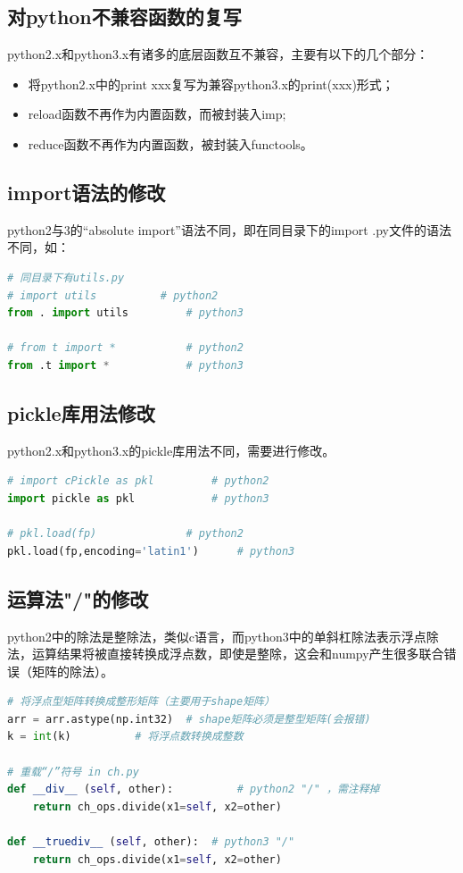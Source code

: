 \documentclass{article}
\begin{document}
\subsection{对python不兼容函数的复写}
python2.x和python3.x有诸多的底层函数互不兼容，主要有以下的几个部分：
\begin{itemize}
	\item 将python2.x中的print xxx复写为兼容python3.x的print(xxx)形式；
	\item reload函数不再作为内置函数，而被封装入imp;
	\item reduce函数不再作为内置函数，被封装入functools。
\end{itemize}

\subsection{import语法的修改}
python2与3的“absolute import”语法不同，即在同目录下的import .py文件的语法不同，如：
\begin{lstlisting}[language=python]
# 同目录下有utils.py
# import utils 			# python2
from . import utils 		# python3
    
# from t import * 			# python2
from .t import * 			# python3
\end{lstlisting}

\subsection{pickle库用法修改}
python2.x和python3.x的pickle库用法不同，需要进行修改。

\begin{lstlisting}[language=python]
# import cPickle as pkl 		# python2
import pickle as pkl 			# python3
	
# pkl.load(fp) 				# python2
pkl.load(fp,encoding='latin1')		# python3
\end{lstlisting}

\subsection{运算法"/"的修改}
python2中的除法是整除法，类似c语言，而python3中的单斜杠除法表示浮点除法，运算结果将被直接转换成浮点数，即使是整除，这会和numpy产生很多联合错误（矩阵的除法）。

\begin{lstlisting}[language=python]
# 将浮点型矩阵转换成整形矩阵（主要用于shape矩阵）
arr = arr.astype(np.int32) 	# shape矩阵必须是整型矩阵(会报错)
k = int(k)			# 将浮点数转换成整数

# 重载“/”符号 in ch.py
def __div__ (self, other):  		# python2 "/" ，需注释掉
	return ch_ops.divide(x1=self, x2=other)

def __truediv__ (self, other):  # python3 "/"
	return ch_ops.divide(x1=self, x2=other)
\end{lstlisting}
\end{document}
